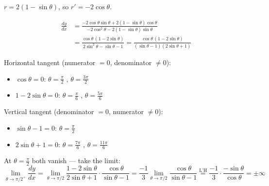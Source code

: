 \begin{example}[Cardioid]
  $r = 2(1-\sin\theta)$, so $r' = -2\cos\theta$.

  \begin{center}
  \end{center}

  \begin{align*}
    \frac{dy}{dx}
     & = \frac{-2\cos\theta\sin\theta + 2(1-\sin\theta)\cos\theta}
    {-2\cos^{2}\theta - 2(1-\sin\theta)\sin\theta}                            \\[4pt]
     & = \frac{\cos\theta\,(1-2\sin\theta)}{2\sin^{2}\theta - \sin\theta - 1}
    = \frac{\cos\theta\,(1-2\sin\theta)}{(\sin\theta - 1)(2\sin\theta + 1)}
  \end{align*}

  Horizontal tangent (numerator $= 0$, denominator $\neq 0$):
  \begin{itemize}[nosep]
    \item $\cos\theta = 0$: $\theta = \frac{\pi}{2}$ \xmark, \;
          $\theta = \frac{3\pi}{2}$ \checkmark
    \item $1 - 2\sin\theta = 0$: $\theta = \frac{\pi}{6}$ \checkmark, \;
          $\theta = \frac{5\pi}{6}$ \checkmark
  \end{itemize}

  Vertical tangent (denominator $= 0$, numerator $\neq 0$):
  \begin{itemize}[nosep]
    \item $\sin\theta - 1 = 0$: $\theta = \frac{\pi}{2}$ \xmark
    \item $2\sin\theta + 1 = 0$: $\theta = \frac{7\pi}{6}$ \checkmark, \;
          $\theta = \frac{11\pi}{6}$ \checkmark
  \end{itemize}

  At $\theta = \frac{\pi}{2}$ both vanish --- take the limit:
  \[
    \lim_{\theta\to\pi/2^{+}} \frac{dy}{dx}
    = \lim_{\theta\to\pi/2}
    \frac{1-2\sin\theta}{2\sin\theta+1}\cdot\frac{\cos\theta}{\sin\theta-1}
    = \frac{-1}{3}\lim_{\theta\to\pi/2}\frac{\cos\theta}{\sin\theta-1}
    \stackrel{\text{L'H}}{=} \frac{-1}{3}\cdot\frac{-\sin\theta}{\cos\theta}
    = \pm\infty
  \]
\end{example}

